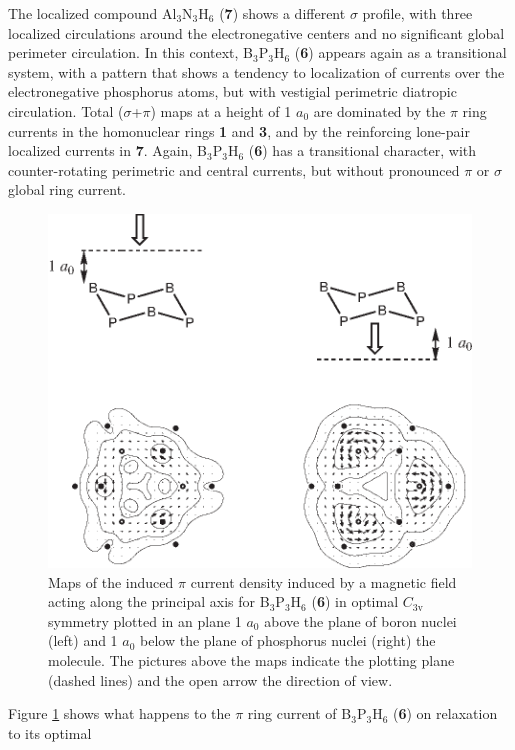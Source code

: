 The localized compound Al$_3$N$_3$H$_6$ (\textbf{7}) shows a different $\sigma$ profile,
with three localized circulations around the electronegative centers
and no significant global perimeter circulation. In this context,
B$_3$P$_3$H$_6$ (\textbf{6}) appears again as a transitional system, with a
pattern that shows a tendency to localization of currents over the
electronegative phosphorus atoms, but with vestigial perimetric diatropic circulation.
Total ($\sigma$+$\pi$) maps at a height of 1 $a_{0}$ are dominated by the
$\pi$ ring currents in the homonuclear rings \textbf{1} and \textbf{3}, and by
the reinforcing lone-pair localized currents in \textbf{7}. Again,
B$_3$P$_3$H$_6$ (\textbf{6}) has a transitional character, with
counter-rotating perimetric and central currents, but without pronounced $\pi$
or $\sigma$ global ring current.
\begin{figure}[htbp]
\center
\includegraphics[scale=0.9]{inorganic/figures/figure5.eps}
\caption{ Maps of the induced $\pi$ current density induced by a magnetic field
acting along the principal axis for B$_3$P$_3$H$_6$ (\textbf{6}) in optimal $C_\mathrm{3v}$ symmetry
plotted in an plane 1 $a_0$ above the plane of boron nuclei (left) and 1 $a_0$ below the plane
of phosphorus nuclei (right) the molecule. The pictures above the maps indicate the plotting plane
(dashed lines) and the open arrow the direction of view.}
\label{ch6.figure5}
\end{figure}
Figure \ref{ch6.figure5} shows what happens to
the $\pi$ ring current of B$_3$P$_3$H$_6$ (\textbf{6}) on relaxation to its optimal
